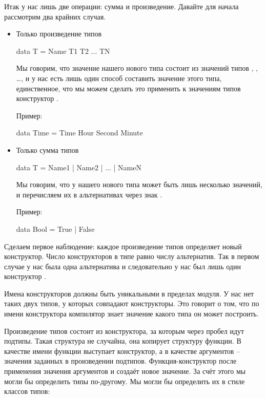 Итак у нас лишь две операции: сумма и произведение. 
Давайте для начала рассмотрим два крайних случая.

\begin{itemize}
\item Только произведение типов

\begin{code}
data T = Name T1 T2 ... TN
\end{code}

Мы говорим, что значение нашего нового типа  состоит из
значений типов , , \dots ,  и у нас есть
лишь один способ составить значение этого типа, 
единственное, что мы можем сделать это применить к 
значениям типов  конструктор .

Пример:

\begin{code}
data Time = Time Hour Second Minute
\end{code}


\item Только сумма типов

\begin{code}
data T = Name1 | Name2 | ... | NameN
\end{code}

Мы говорим, что у нашего нового типа  может быть
лишь несколько значений, и перечисляем их в альтернативах
через знак \In{|}. 

Пример:

\begin{code}
data Bool = True | False
\end{code}


\end{itemize}

Сделаем первое наблюдение: каждое произведение типов 
определяет новый конструктор. Число конструкторов в типе 
равно числу альтернатив. Так в первом случае у нас была одна
альтернатива и следовательно у нас был лишь один конструктор
. 

Имена конструкторов должны быть уникальными в пределах модуля.
У нас нет таких двух типов, у которых совпадают конструкторы.
Это говорит о том, что по имени конструктора компилятор
знает значение какого типа он может построить. 

Произведение типов состоит из конструктора, за которым
через пробел идут подтипы. Такая структура не случайна,
она копирует структуру функции. В качестве имени функции
выступает конструктор, а в качестве аргументов -- значения
заданных в произведении подтипов. Функция-конструктор 
после применения  значения аргументов
и создаёт новое значение. За счёт этого мы могли бы 
определить типы по-другому. Мы могли бы определить их в стиле
классов типов:

